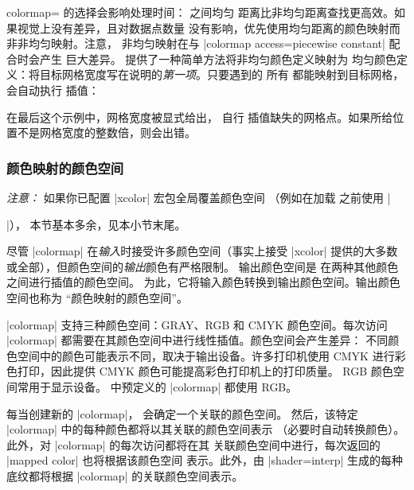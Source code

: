 \begin{pgfplotskey}{colormap=}
     的选择会影响处理时间： 之间均匀
    距离比非均匀距离查找更高效。如果视觉上没有差异，且对数据点数量
    没有影响，优先使用均匀距离的颜色映射而非非均匀映射。注意，
    非均匀映射在与 |colormap access=piecewise constant| 配合时会产生
    巨大差异。\PGFPlots{} 提供了一种简单方法将非均匀颜色定义映射为
    均匀颜色定义：将目标网格宽度写在说明的\emph{第一项}。只要遇到的
    所有  都能映射到目标网格，\PGFPlots{} 会自动执行
    插值：

\begin{codeexample}[code only]
\end{codeexample}

    \noindent 在最后这个示例中，网格宽度被显式给出，\PGFPlots{} 自行
    插值缺失的网格点。如果所给位置不是网格宽度的整数倍，则会出错。


    \subsubsection{颜色映射的颜色空间}

    \emph{注意：} 如果你已配置 |xcolor| 宏包全局覆盖颜色空间
    （例如在加载 \PGFPlots{} 之前使用 |\usepackage[cmyk]{xcolor}|），
    本节基本多余，见本小节末尾。

    尽管 |colormap| 在\emph{输入}时接受许多颜色空间（事实上接受 |xcolor|
    提供的大多数或全部），但颜色空间的\emph{输出}颜色有严格限制。
    输出颜色空间是 \PGFPlots{} 在两种其他颜色之间进行插值的颜色空间。
    为此，它将输入颜色转换到输出颜色空间。输出颜色空间也称为
    ``颜色映射的颜色空间''。

    |colormap| 支持三种颜色空间：GRAY、RGB 和 CMYK 颜色空间。每次访问
    |colormap| 都需要在其颜色空间中进行线性插值。颜色空间会产生差异：
    不同颜色空间中的颜色可能表示不同，取决于输出设备。许多打印机使用
    CMYK 进行彩色打印，因此提供 CMYK 颜色可能提高彩色打印机上的打印质量。
    RGB 颜色空间常用于显示设备。\PGFPlots{} 中预定义的 |colormap| 都使用 RGB。

    每当创建新的 |colormap|，\PGFPlots{} 会确定一个关联的颜色空间。
    然后，该特定 |colormap| 中的每种颜色都将以其关联的颜色空间表示
    （必要时自动转换颜色）。此外，对 |colormap| 的每次访问都将在其
    关联颜色空间中进行，每次返回的 |mapped color| 也将根据该颜色空间
    表示。此外，由 |shader=interp| 生成的每种底纹都将根据 |colormap|
    的关联颜色空间表示。


\end{pgfplotskey}
